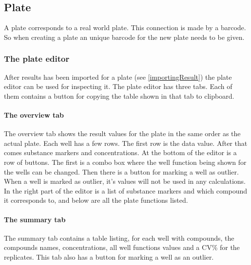 \documentclass[a4paper,10pt]{article}
\begin{document}
        \subsection{Plate}
            A plate corresponds to a real world plate. This connection is made
            by a barcode. So when creating a plate an unique barcode for the new
            plate needs to be given. 

            \subsubsection{The plate editor}
                After results has been imported for a plate (see
                \ref{importingResult}) the plate editor can be used for
                inspecting it. The plate editor has three tabs. Each of
                them contains a button for copying the table shown in that tab
                to clipboard.

                \paragraph{The overview tab}
                    The overview tab shows the result values for the plate in
                    the same order as the actual plate. Each well has a few
                    rows. The first row is the data value. After that comes
                    substance markers and concentrations. At the bottom of the
                    editor is a row of buttons. The first is a combo box where
                    the well function being shown for the wells can be
                    changed. Then there is a button for marking a well as
                    outlier. When a well is marked as outlier, it's values will
                    not be used in any calculations. In the right part of the
                    editor is a list of substance markers and which compound it
                    corresponds to, and below are all the plate functions
                    listed.

                \paragraph{The summary tab}
                    The summary tab contains a table listing, for each well
                    with compounds, the compounds names, concentrations, all
                    well functions values and a CV\% for the replicates. This
                    tab also has a button for marking a well as an outlier. 
\end{document}
